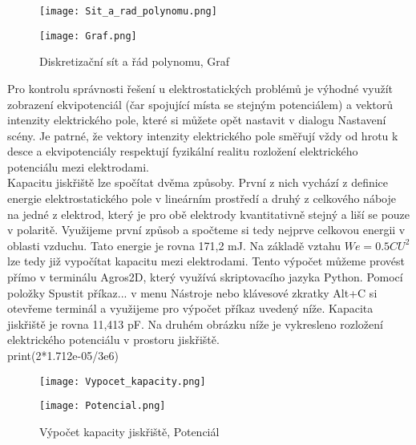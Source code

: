 \documentclass[a4paper, oneside]{article}
\begin{document}
\begin{figure}[htbp]
	\centering
	\begin{minipage}{7cm}
		\centering
		\texttt{[image: Sit\_a\_rad\_polynomu.png]}
	\end{minipage}
	\begin{minipage}{5cm}
		\centering
		\texttt{[image: Graf.png]}
	\end{minipage}
\caption{Diskretizační sít a řád polynomu, Graf}
\end{figure}	

Pro kontrolu správnosti řešení u elektrostatických problémů je výhodné využít zobrazení ekvipotenciál (čar spojující místa se stejným potenciálem) a vektorů intenzity elektrického pole, které si můžete opět nastavit v dialogu Nastavení scény. Je patrné, že vektory intenzity elektrického pole směřují vždy od hrotu k desce a ekvipotenciály respektují fyzikální realitu rozložení elektrického potenciálu mezi elektrodami.\\
	Kapacitu jiskřiště lze spočítat dvěma způsoby. První z nich vychází z definice energie elektrostatického pole v lineárním prostředí a druhý z celkového náboje na jedné z elektrod, který je pro obě elektrody kvantitativně stejný a liší se pouze v polaritě. Využijeme první způsob a spočteme si tedy nejprve celkovou energii v oblasti vzduchu. Tato energie je rovna 171,2 mJ. Na základě vztahu $We = 0.5 CU^2$ lze tedy již vypočítat kapacitu mezi elektrodami. Tento výpočet můžeme provést přímo v terminálu Agros2D, který využívá skriptovacího jazyka Python. Pomocí položky Spustit příkaz... v menu Nástroje nebo klávesové zkratky Alt+C si otevřeme terminál a využijeme pro výpočet příkaz uvedený níže. Kapacita jiskřiště je rovna 11,413 pF. Na druhém obrázku níže je vykresleno rozložení elektrického potenciálu v prostoru jiskřiště.\\
print(2*1.712e-05/3e6)\\

\begin{figure}[htbp]
	\centering
	\begin{minipage}{7cm}
		\centering
		\texttt{[image: Vypocet\_kapacity.png]}
	\end{minipage}
	\begin{minipage}{5cm}
		\centering
		\texttt{[image: Potencial.png]}
	\end{minipage}
\caption{Výpočet kapacity jiskřiště, Potenciál}
\end{figure}	

\newpage
\end{document}
